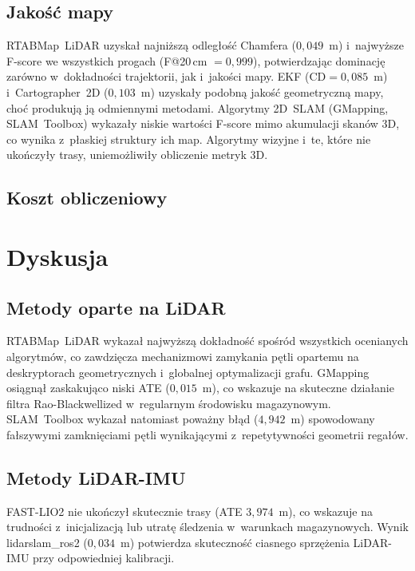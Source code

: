 \subsection{Jakość mapy}

RTABMap~LiDAR uzyskał najniższą odległość Chamfera ($0{,}049$~m)
i~najwyższe F-score we wszystkich progach (F@20\,cm $= 0{,}999$),
potwierdzając dominację zarówno w~dokładności trajektorii, jak i~jakości mapy.
EKF ($\text{CD} = 0{,}085$~m) i~Cartographer~2D ($0{,}103$~m) uzyskały
podobną jakość geometryczną mapy, choć produkują ją odmiennymi metodami.
Algorytmy 2D~SLAM (GMapping, SLAM~Toolbox) wykazały niskie wartości F-score
mimo akumulacji skanów 3D, co wynika z~płaskiej struktury ich map.
Algorytmy wizyjne i~te, które nie ukończyły trasy, uniemożliwiły obliczenie
metryk 3D.

\subsection{Koszt obliczeniowy}


\section{Dyskusja}

\subsection{Metody oparte na LiDAR}

RTABMap~LiDAR wykazał najwyższą dokładność spośród wszystkich ocenianych
algorytmów, co zawdzięcza mechanizmowi zamykania pętli opartemu na deskryptorach
geometrycznych i~globalnej optymalizacji grafu.
GMapping osiągnął zaskakująco niski ATE ($0{,}015$~m), co wskazuje na skuteczne
działanie filtra Rao-Blackwellized w~regularnym środowisku magazynowym.
SLAM~Toolbox wykazał natomiast poważny błąd ($4{,}942$~m) spowodowany fałszywymi
zamknięciami pętli wynikającymi z~repetytywności geometrii regałów.

\subsection{Metody LiDAR-IMU}

FAST-LIO2 nie ukończył skutecznie trasy (ATE $3{,}974$~m), co wskazuje na trudności
z~inicjalizacją lub utratę śledzenia w~warunkach magazynowych.
Wynik lidarslam\_ros2 ($0{,}034$~m) potwierdza skuteczność ciasnego sprzężenia
LiDAR-IMU przy odpowiedniej kalibracji.

